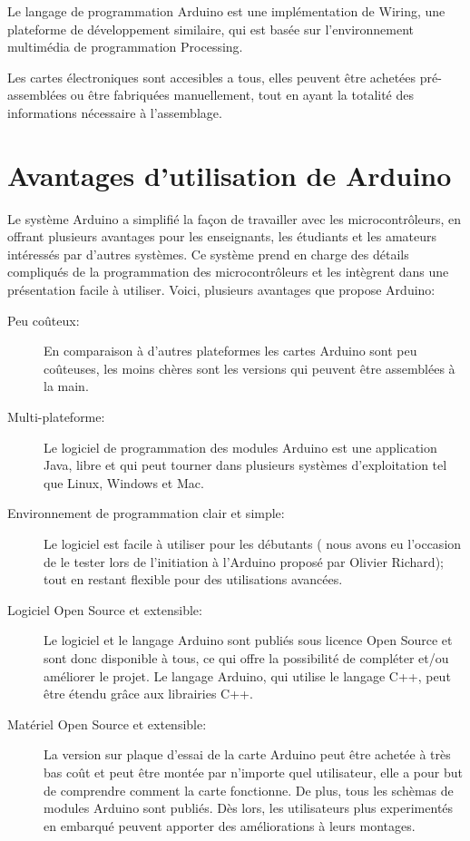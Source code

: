 Le langage de programmation Arduino est une implémentation de Wiring, une plateforme de développement similaire, qui est basée sur l'environnement
multimédia de programmation Processing.

Les cartes électroniques sont accesibles a tous, elles peuvent être achetées pré-assemblées ou être fabriquées manuellement, tout en ayant la totalité des
informations nécessaire à l'assemblage.

\section{Avantages d'utilisation de Arduino}

Le système Arduino a simplifié la façon de travailler avec les microcontrôleurs, en offrant plusieurs avantages pour les enseignants, les étudiants et
les amateurs intéressés par d'autres systèmes. Ce système prend en charge des détails compliqués de la programmation des microcontrôleurs et les intègrent
dans une présentation facile à utiliser. Voici, plusieurs avantages que propose Arduino:

\begin{description}
 \item[Peu coûteux:] En comparaison à d'autres plateformes les cartes Arduino sont peu coûteuses, les moins chères sont les versions qui peuvent être
assemblées à la main.
 \item[Multi-plateforme:] Le logiciel de programmation des modules Arduino est une application Java, libre et qui peut tourner dans plusieurs systèmes
d'exploitation tel que Linux, Windows et Mac.
 \item[Environnement de programmation clair et simple:] Le logiciel est facile à utiliser pour les débutants ( nous avons eu l'occasion de le tester lors de
l'initiation à l'Arduino proposé par Olivier Richard); tout en restant flexible pour des utilisations avancées.
 \item[Logiciel Open Source et extensible:] Le logiciel et le langage Arduino sont publiés sous licence Open Source et sont donc disponible à tous, ce qui
offre la possibilité de compléter et/ou améliorer le projet. Le langage Arduino, qui utilise le langage C++, peut être étendu grâce aux librairies C++.
 \item[Matériel Open Source et extensible:] La version sur plaque d'essai de la carte Arduino peut être achetée à très bas coût et peut être montée par
n'importe quel utilisateur, elle a pour but de comprendre comment la carte fonctionne. De plus, tous les schèmas de modules Arduino sont publiés. Dès lors, les
utilisateurs plus experimentés en embarqué peuvent apporter des améliorations à leurs montages.
\end{description}


